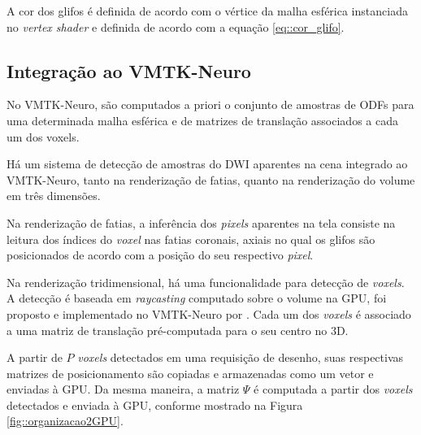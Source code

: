 \documentclass[
    12pt,                %
    oneside,            %
    a4paper,            %
    english,            %
    french,                %
    spanish,            %
    brazil                %
    ]{abntex2}
\begin{document}
A cor dos glifos é definida de acordo com o vértice da malha esférica instanciada no \textit{vertex shader} e definida de acordo com a equação \ref{eq::cor_glifo}.






\subsection{Integração ao VMTK-Neuro}

No VMTK-Neuro, são computados a priori o conjunto de amostras de ODFs para uma determinada malha esférica e de matrizes de translação associados a cada um dos voxels.

Há um sistema de detecção de amostras do DWI aparentes na cena integrado ao VMTK-Neuro, tanto na renderização de fatias, quanto na renderização do volume em três dimensões.

Na renderização de fatias, a inferência dos \textit{pixels} aparentes na tela consiste na leitura dos índices do \textit{voxel} nas fatias coronais, axiais no qual os glifos são posicionados de acordo com a posição do seu respectivo \textit{pixel}.

Na renderização tridimensional, há uma funcionalidade para detecção de \textit{voxels}. A detecção é baseada em \textit{raycasting} computado sobre o volume na GPU, foi proposto e implementado no VMTK-Neuro por . Cada um dos \textit{voxels} é associado a uma matriz de translação pré-computada para o seu centro no 3D.

A partir de $P$ \textit{voxels} detectados em uma requisição de desenho, suas respectivas matrizes de posicionamento são copiadas e armazenadas como um vetor e enviadas à GPU. Da mesma maneira, a matriz $\Psi$ é computada a partir dos \textit{voxels} detectados e enviada à GPU, conforme mostrado na Figura \ref{fig::organizacao2GPU}.
\end{document}
